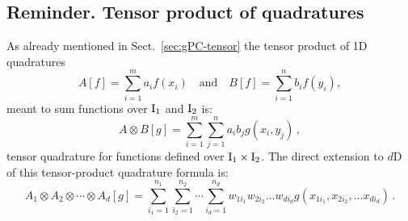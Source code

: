 \documentclass{eurosae}
\def\Ir{{\textrm I}}
\newcommand{\sref}[1]{Sect.~\ref{#1}}
\begin{document}
\subsection{Reminder. Tensor product of quadratures}
%
As already mentioned in \sref{sec:gPC-tensor} the tensor product of 1D quadratures
%
 $$ A[f]=\sum_{i=1}^m a_i f(x_i)\quad\text{and}\quad B[f] =\sum_{i=1}^n b_i f(y_i),  $$ 
%
meant to sum functions over $\Ir_1$ and $\Ir_2$ is:   
%
$$ A \otimes B[g] = \sum_{i=1}^m \sum_{j=1}^n a_i b_j g(x_i,y_j)\,, $$
%
 tensor quadrature for functions defined over  $\Ir_1 \times \Ir_2$. The direct extension to $d$D of this tensor-product quadrature formula is:
%
$$  A_{1}\otimes A_2 \otimes\cdots\otimes A_{d}[g] = \sum_{i_1=1}^{n_{1}} \sum_{i_2=1}^{n_2}\cdots \sum_{i_d=1}^{n_{d}} w_{1i_1}w_{2i_2}\dots w_{di_d} g(x_{1i_1},x_{2i_2},\dots x_{di_d})\,. $$
%
\end{document}
